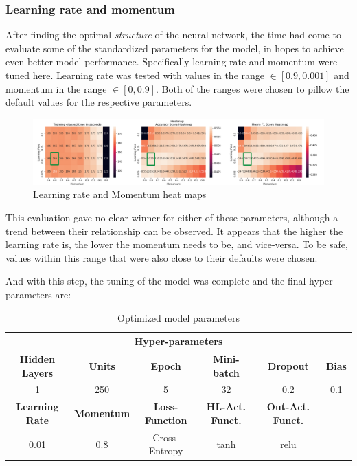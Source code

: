 \subsubsection{Learning rate and momentum}
After finding the optimal \textit{structure} of the neural network, the time had come to evaluate some of the standardized parameters for the model, in hopes to achieve even better model performance. Specifically learning rate and momentum were tuned here. Learning rate was tested with values in the range $\in[0.9, 0.001]$ and momentum in the range $\in[0, 0.9]$. Both of the ranges were chosen to pillow the default values for the respective parameters.

\begin{figure}[H]
\centering
\includegraphics[width=1\linewidth]{pictures/lrm_heatmap.png}
\caption{Learning rate and Momentum heat maps}
\label{fig:lrm_heatmap}
\end{figure}

This evaluation gave no clear winner for either of these parameters, although a trend between their relationship can be observed. It appears that the higher the learning rate is, the lower the momentum needs to be, and vice-versa. To be safe, values within this range that were also close to their defaults were chosen.

And with this step, the tuning of the model was complete and the final hyper-parameters are:

\begin{table}[H]
    \centering
    \begin{tabular}{ |c|c|c|c|c|c| }
        \hline
        \multicolumn{6}{|c|}{\textbf{Hyper-parameters}} \\
        \hline
        \textbf{Hidden Layers} & \textbf{Units} & \textbf{Epoch} & \textbf{Mini-batch} & \textbf{Dropout} & \textbf{Bias} \\
        \hline
        1 & 250 & 5 & 32 & 0.2 & 0.1 \\
        \hline
         \textbf{Learning Rate} & \textbf{Momentum} & \textbf{Loss-Function} & \textbf{HL-Act. Funct.} & \textbf{Out-Act. Funct.} &\\
        \hline
        0.01 & 0.8 & Cross-Entropy & tanh & relu & \\
        \hline
    \end{tabular}
    \caption{Optimized model parameters}
    \label{table:optimal_params}
\end{table}
